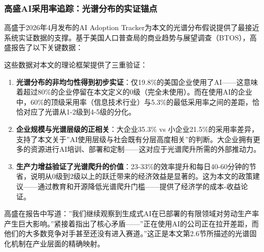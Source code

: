 \subsubsection{高盛AI采用率追踪：光谱分布的实证锚点}

高盛于2026年4月发布的AI Adoption Tracker为本文的光谱分布假说提供了最接近系统实证数据的支撑。基于美国人口普查局的商业趋势与展望调查（BTOS），高盛报告了以下关键数据：

\begin{center}
\end{center}

这些数据对本文的理论框架提供了三重验证：

\begin{enumerate}
\item \textbf{光谱分布的非均匀性得到初步实证}：仅19.8\%的美国企业使用了AI——这意味着超过80\%的企业停留在本文定义的0级（完全未使用）。而在使用AI的企业中，60\%的顶级采用率（信息技术行业）与5.3\%的最低采用率之间的差距，恰恰对应了光谱从1-2级到4-5级的分化。
\item \textbf{企业规模与光谱层级的正相关}：大企业35.3\% vs 小企业21.5\%的采用率差异，支持了本文关于''AI使用层级与社会既有分层高度相关''的判断。大企业拥有更多的资源进行AI培训、部署和定制——这对应于光谱爬升所需的外部推动力。
\item \textbf{生产力增益验证了光谱爬升的价值}：23-33\%的效率提升和每日40-60分钟的节省，说明从0级到2级以上的跃迁带来的经济效益是显著的。这为本文的政策建议——通过教育和开源降低光谱爬升门槛——提供了经济学的成本-收益论证。
\end{enumerate}

高盛在报告中写道：''我们继续观察到生成式AI在已部署的有限领域对劳动生产率产生巨大影响。''紧接着指出了核心矛盾——''正在使用AI的公司正在拉开差距，而他们的大多数竞争对手甚至还没有进入赛道。''这正是本文第2.6节所描述的光谱固化机制在产业层面的精确映射。

